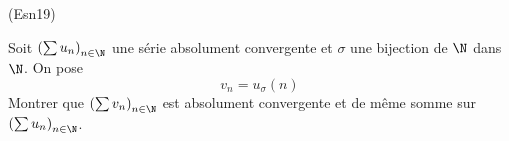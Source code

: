 \begin{tiny}(Esn19)\end{tiny} Soit $\left( \sum u_n\right)_{n\in \N}$ une série absolument convergente et $\sigma$ une bijection de $\N$ dans $\N$. On pose
\begin{displaymath}
  v_n = u_{\sigma}(n)
\end{displaymath}
Montrer que $\left( \sum v_n\right)_{n\in \N}$ est absolument convergente et de même somme sur $\left( \sum u_n\right)_{n\in \N}$.